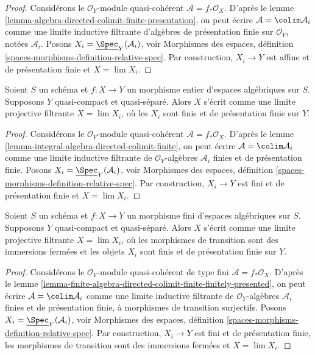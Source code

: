 \begin{proof}
Considérons le $\mathcal{O}_Y$-module quasi-cohérent
$\mathcal{A} = f_*\mathcal{O}_X$. D'après le
lemme \ref{lemma-algebra-directed-colimit-finite-presentation},
on peut écrire $\mathcal{A} = \colim \mathcal{A}_i$ comme une limite
inductive filtrante d'algèbres de présentation finie
sur $\mathcal{O}_Y$, notées $\mathcal{A}_i$.
Posons $X_i = \underline{\Spec}_Y(\mathcal{A}_i)$, voir
Morphismes des espaces, définition
\ref{spaces-morphisms-definition-relative-spec}.
Par construction, $X_i \to Y$ est affine et de présentation finie
et $X = \lim X_i$.
\end{proof}

\begin{lemma}
\label{lemma-integral-limit-finite-and-finite-presentation}
Soient $S$ un schéma et $f : X \to Y$ un morphisme entier d'espaces
algébriques sur $S$. Supposons $Y$ quasi-compact et quasi-séparé.
Alors $X$ s'écrit comme une limite projective filtrante $X = \lim X_i$,
où les $X_i$ sont finis et de présentation finie sur $Y$.
\end{lemma}

\begin{proof}
Considérons le $\mathcal{O}_Y$-module quasi-cohérent
$\mathcal{A} = f_*\mathcal{O}_X$. D'après le
lemme \ref{lemma-integral-algebra-directed-colimit-finite},
on peut écrire $\mathcal{A} = \colim \mathcal{A}_i$ comme une limite
inductive filtrante de $\mathcal{O}_Y$-algèbres
$\mathcal{A}_i$ finies et de présentation finie.
Posons $X_i = \underline{\Spec}_Y(\mathcal{A}_i)$, voir
Morphismes des espaces, définition
\ref{spaces-morphisms-definition-relative-spec}.
Par construction, $X_i \to Y$ est fini et de présentation finie et
$X = \lim X_i$.
\end{proof}

\begin{lemma}
\label{lemma-finite-in-finite-and-finite-presentation}
Soient $S$ un schéma et $f : X \to Y$ un morphisme fini d'espaces
algébriques sur $S$. Supposons $Y$ quasi-compact et quasi-séparé.
Alors $X$ s'écrit comme une limite projective filtrante $X = \lim X_i$,
où les morphismes de transition sont des immersions fermées et les objets
$X_i$ sont finis et de présentation finie sur $Y$.
\end{lemma}

\begin{proof}
Considérons le $\mathcal{O}_Y$-module quasi-cohérent de type fini
$\mathcal{A} = f_*\mathcal{O}_X$. D'après le
lemme \ref{lemma-finite-algebra-directed-colimit-finite-finitely-presented},
on peut écrire $\mathcal{A} = \colim \mathcal{A}_i$ comme une limite
inductive filtrante de $\mathcal{O}_Y$-algèbres
$\mathcal{A}_i$ finies et de présentation finie, à morphismes de transition surjectifs.
Posons $X_i = \underline{\Spec}_Y(\mathcal{A}_i)$, voir
Morphismes des espaces, définition
\ref{spaces-morphisms-definition-relative-spec}.
Par construction, $X_i \to Y$ est fini et de présentation finie,
les morphismes de transition sont des immersions fermées et $X = \lim X_i$.
\end{proof}

